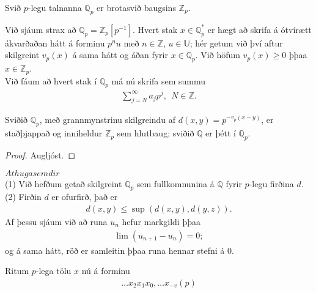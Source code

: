 \begin{skilgr}
 Svið $p$-legu talnanna $\mathbb{Q}_p$ er brotasvið baugsins $\mathbb{Z}_p$.
\end{skilgr}
Við sjáum strax að $\mathbb{Q}_p = \mathbb{Z}_p[p^{-1}]$. Hvert stak 
$x \in \mathbb{Q}_p^*$ er hægt að skrifa á ótvírætt ákvarðaðan hátt á forminu 
$p^nu$ með $n \in \mathbb{Z}$, $u \in \mathbb{U}$; hér getum við því aftur 
skilgreint $v_p(x)$ á sama hátt og áðan fyrir $x \in \mathbb{Q}_p$. 
Við höfum $v_p(x) \geq 0$ þþaa $x \in \mathbb{Z}_p$. 
\\Við fáum að hvert stak í $\mathbb{Q}_p$ má nú skrifa sem summu
\begin{align*}
 \sum_{j=N}^{\infty} a_jp^j,\ \ N \in \mathbb{Z}.
\end{align*}
\begin{setn}
 Sviðið $\mathbb{Q}_p$, með grannmynstrinu skilgreindu af 
$d(x,y) = p^{-v_p(x-y)}$, er staðþjappað og inniheldur $\mathbb{Z}_p$ sem 
hlutbaug; sviðið $\mathbb{Q}$ er þétt í $\mathbb{Q}_p$.
\end{setn}
\begin{proof}
 Augljóst.
\end{proof}
$Athugasemdir$\\
(1) Við hefðum getað skilgreint $\mathbb{Q}_p$ sem fullkomnunina á $\mathbb{Q}$ 
fyrir $p$-legu firðina $d$.\\
(2) Firðin $d$ er ofurfirð, það er 
\begin{align*}
 d(x,y) \leq \sup (d(x,y),d(y,z)).
\end{align*}
Af þessu sjáum við að runa $u_n$ hefur markgildi þþaa 
\begin{align*}
 \lim(u_{n+1} - u_n) = 0;
\end{align*}
og á sama hátt, röð er samleitin þþaa runa hennar stefni á 0.\\
\begin{Rit}
Ritum $p$-lega tölu $x$ nú á forminu
\begin{align*}
 \ldots x_2 x_1x_0, \ldots x_{-v} (p)
\end{align*}
\end{Rit}
